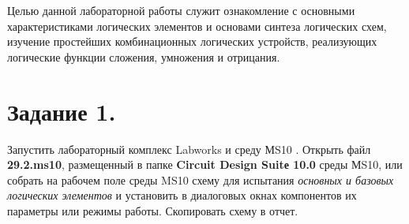 \documentclass[spec, och, otchet, hidelinks]{SCWorks}
\begin{document}


\tableofcontents






\intro

\par Целью данной лабораторной работы служит ознакомление с основными характеристиками логических 
элементов и основами синтеза логических схем, изучение простейших комбинационных логических
устройств, реализующих логические функции сложения, умножения и отрицания.

\newpage

\section*{Задание 1.}

\par Запустить лабораторный комплекс Labworks и среду МS10 . Открыть файл \textbf{29.2.ms10}, 
размещенный в папке \textbf{Circuit Design Suitе 10.0} среды МS10, или собрать на рабочем поле 
среды MS10 схему для испытания \textit{основных и базовых логических элементов} и установить в 
диалоговых окнах компонентов их параметры или режимы работы. Скопировать схему в отчет.
\end{document}
